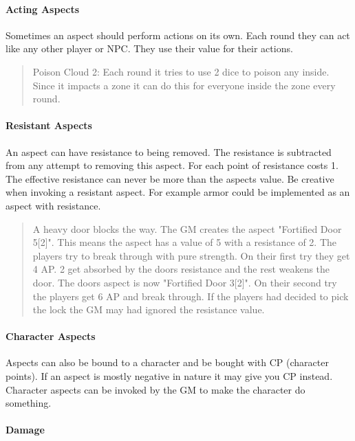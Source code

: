 \documentclass[11pt]{article}
\begin{document}
{\paragraph*{Acting Aspects}
\label{sec:orgb8dd8ee}

Sometimes an aspect should perform actions on its own. Each round they can act like any other player or NPC. They use their value for their actions.

\begin{quote}
Poison Cloud 2: Each round it tries to use 2 dice to poison any inside. Since it impacts a zone it can do this for everyone inside the zone every round.
\end{quote}

\paragraph*{Resistant Aspects}
\label{sec:orge57eeb1}

An aspect can have resistance to being removed. The resistance is subtracted from any attempt to removing this aspect. For each point of resistance costs 1. The effective resistance can never be more than the aspects value. Be creative when invoking a resistant aspect. For example armor could be implemented as an aspect with resistance.

\begin{quote}
A heavy door blocks the way. The GM creates the aspect "Fortified Door 5[2]". This means the aspect has a value of 5 with a resistance of 2. The players try to break through with pure strength. On their first try they get 4 AP. 2 get absorbed by the doors resistance and the rest weakens the door. The doors aspect is now "Fortified Door 3[2]". On their second try the players get 6 AP and break through.
If the players had decided to pick the lock the GM may had ignored the resistance value.
\end{quote}


\paragraph*{Character Aspects}
\label{sec:org7c676ff}

Aspects can also be bound to a character and be bought with CP (character points). If an aspect is mostly negative in nature it may give you CP instead. Character aspects can be invoked by the GM to make the character do something. 

\paragraph*{Damage}
\label{sec:org0e13e5f}

}
\end{document}
